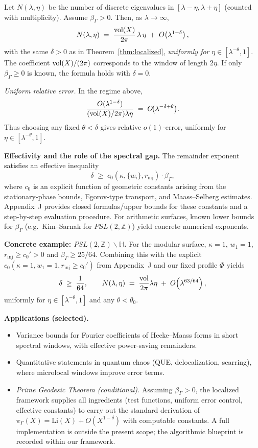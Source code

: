 \begin{theorem}\label{thm:local-weyl}
Let $N(\lambda,\eta)$ be the number of discrete eigenvalues in
$[\lambda-\eta,\lambda+\eta]$ (counted with multiplicity). Assume
$\beta_\Gamma>0$. Then, as $\lambda\to\infty$,
\[
  N(\lambda,\eta)
  \;=\; \frac{\operatorname{vol}(X)}{2\pi}\,\lambda\,\eta \;+\; O\!\left(\lambda^{1-\delta}\right),
\]
with the same $\delta>0$ as in Theorem~\ref{thm:localized}, \emph{uniformly for}
$\eta\in[\lambda^{-\theta},1]$. The coefficient $\operatorname{vol}(X)/(2\pi)$ corresponds to
the window of length $2\eta$. If only $\beta_\Gamma\ge 0$ is known, the formula
holds with $\delta=0$.
\end{theorem}

\noindent\emph{Uniform relative error.} In the regime above,
\[
  \frac{O(\lambda^{1-\delta})}{(\operatorname{vol}(X)/2\pi)\lambda\eta}
  \;=\; O\!\bigl(\lambda^{-\delta+\theta}\bigr).
\]
Thus choosing any fixed $\theta<\delta$ gives relative $o(1)$-error, uniformly
for $\eta\in[\lambda^{-\theta},1]$.

\medskip
\noindent\textbf{Effectivity and the role of the spectral gap.}
The remainder exponent satisfies an effective inequality
\[
  \delta \;\ge\; c_0(\kappa,\{w_i\},r_{\mathrm{inj}})\cdot \beta_\Gamma,
\]
where $c_0$ is an explicit function of geometric constants arising from the
stationary-phase bounds, Egorov-type transport, and Maass–Selberg estimates.
Appendix~J provides closed formulas/upper bounds for these constants and a
step-by-step evaluation procedure. For arithmetic surfaces, known lower bounds
for $\beta_\Gamma$ (e.g.\ Kim–Sarnak for $PSL(2,\mathbb{Z})$) yield concrete
numerical exponents.

\medskip
\noindent\textbf{Concrete example: $PSL(2,\mathbb{Z})\backslash\mathbb{H}$.}
For the modular surface, $\kappa=1$, $w_1=1$, $r_{\mathrm{inj}}\ge c_0'>0$ and
$\beta_\Gamma\ge 25/64$. Combining this with the explicit
$c_0(\kappa=1,w_1=1,r_{\mathrm{inj}}\ge c_0')$ from Appendix~J and our fixed
profile $\Phi$ yields
\[
  \delta \;\ge\; \frac{1}{64},\qquad
  N(\lambda,\eta) \;=\; \frac{\operatorname{vol}}{2\pi}\lambda\eta \;+\; O\!\left(\lambda^{63/64}\right),
\]
uniformly for $\eta\in[\lambda^{-\theta},1]$ and any $\theta<\theta_0$.

\medskip
\noindent\textbf{Applications (selected).}
\begin{itemize}
  \item Variance bounds for Fourier coefficients of Hecke–Maass forms in short
  spectral windows, with effective power-saving remainders.
  \item Quantitative statements in quantum chaos (QUE, delocalization, scarring),
  where microlocal windows improve error terms.
  \item \emph{Prime Geodesic Theorem (conditional).} Assuming $\beta_\Gamma>0$,
  the localized framework supplies all ingredients (test functions, uniform error
  control, effective constants) to carry out the standard derivation of
  \(
    \pi_\Gamma(X) = \mathrm{Li}(X) + O\!\left(X^{1-\delta}\right)
  \)
  with computable constants. A full implementation is outside the present scope;
  the algorithmic blueprint is recorded within our framework.
\end{itemize}

